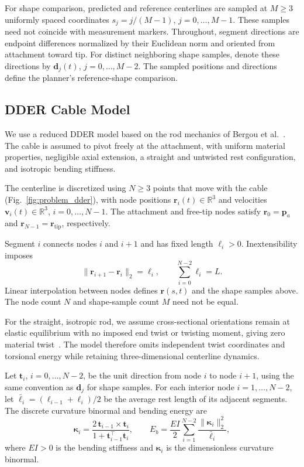 \documentclass[letterpaper, 10 pt, conference]{ieeeconf}
\begin{document}
For shape comparison, predicted and reference centerlines are
sampled at $M\geq3$ uniformly spaced coordinates
$s_j=j/(M-1)$, $j=0,\ldots,M-1$.
These samples need not coincide with measurement markers.
Throughout, segment directions are endpoint differences normalized
by their Euclidean norm and oriented from attachment toward tip.
For distinct neighboring shape samples, denote these directions by
$\mathbf d_j(t)$, $j=0,\ldots,M-2$.
The sampled positions and directions define the planner's
reference-shape comparison.

\subsection{DDER Cable Model}
\label{subsec:dder_model}

We use a reduced DDER model based on the rod mechanics of
Bergou et al.~\cite{bergou2008discrete}. The cable is assumed to
pivot freely at the attachment, with uniform material properties,
negligible axial extension, a straight and untwisted rest
configuration, and isotropic bending stiffness.

The centerline is discretized using $N\geq3$ points that move
with the cable (Fig.~\ref{fig:problem_dder}), with node positions
$\mathbf r_i(t)\in\mathbb R^3$ and velocities
$\mathbf v_i(t)\in\mathbb R^3$, $i=0,\ldots,N-1$.
The attachment and free-tip nodes satisfy
$\mathbf r_0=\mathbf p_a$ and
$\mathbf r_{N-1}=\mathbf r_{\mathrm{tip}}$, respectively.

Segment $i$ connects nodes $i$ and $i+1$ and has fixed length
$\ell_i>0$. Inextensibility imposes
\[
\|\mathbf r_{i+1}-\mathbf r_i\|_2=\ell_i,
\qquad
\sum_{i=0}^{N-2}\ell_i=L.
\]
Linear interpolation between nodes defines $\mathbf r(s,t)$ and
the shape samples above. The node count $N$ and shape-sample
count $M$ need not be equal.

For the straight, isotropic rod, we assume cross-sectional
orientations remain at elastic equilibrium with no imposed end
twist or twisting moment, giving zero material
twist~\cite{bergou2008discrete}. The model therefore omits
independent twist coordinates and torsional energy while
retaining three-dimensional centerline dynamics.

Let $\mathbf t_i$, $i=0,\ldots,N-2$, be the
unit direction from node $i$ to node $i+1$, using the same
convention as $\mathbf d_j$ for shape samples.
For each interior node $i=1,\ldots,N-2$, let
$\bar\ell_i=(\ell_{i-1}+\ell_i)/2$ be the average rest length
of its adjacent segments.
The discrete curvature binormal and bending energy are
\begin{equation}
\boldsymbol\kappa_i
=\frac{2\,\mathbf t_{i-1}\times\mathbf t_i}
{1+\mathbf t_{i-1}^\top\mathbf t_i},
\qquad
E_b=\frac{EI}{2}
\sum_{i=1}^{N-2}\frac{\|\boldsymbol\kappa_i\|_2^2}{\bar\ell_i},
\label{eq:bending_energy}
\end{equation}
where $EI>0$ is the bending stiffness and
$\boldsymbol\kappa_i$ is the dimensionless curvature binormal.
\end{document}
